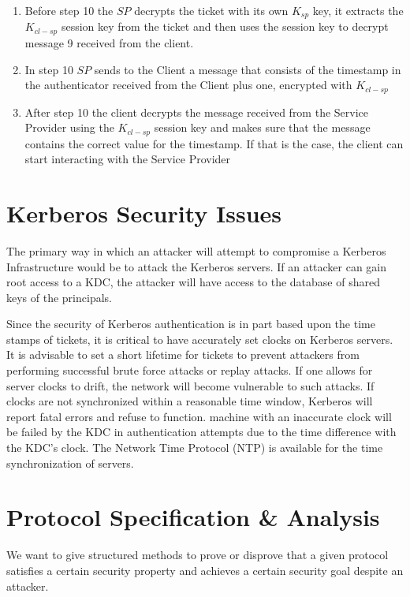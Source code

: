 \begin{enumerate}
	\item Before step 10 the $SP$ decrypts the ticket with its own $K_{sp}$ key, it extracts the $K_{cl-sp}$ session key from the ticket and then uses the session key to decrypt message 9 received from the client.
	\item In step 10 $SP$ sends to the Client a message that consists of the timestamp in the authenticator received from the Client plus one, encrypted with $K_{cl-sp}$
	\item After step 10 the client decrypts the message received from the Service Provider using the $K_{cl-sp}$ session key and makes sure that the message contains the correct value for the timestamp. If that is the case, the client can start interacting with the Service Provider
\end{enumerate}

\section{Kerberos Security Issues}
The primary way in which an attacker will attempt to compromise a Kerberos Infrastructure would be to attack the Kerberos servers. If an attacker can gain root access to a KDC, the attacker will have access to the database of shared keys of the principals. 

Since the security of Kerberos authentication is in part based upon the time stamps of tickets, it is critical to have accurately set clocks on Kerberos servers. It is advisable to set a short lifetime for tickets to prevent attackers from performing successful brute force attacks or replay attacks. If one allows for server clocks to drift, the network will become vulnerable to such attacks. If clocks are not synchronized within a reasonable time window, Kerberos will report fatal errors and refuse to function.  machine with an inaccurate clock will be failed by the KDC in authentication attempts due to the time difference with the KDC's clock.
The Network Time Protocol (NTP) is available for the time synchronization of servers.



\section{Protocol Specification \& Analysis}
We want to give structured methods to prove or disprove that a given protocol satisfies a certain security property and achieves a certain security goal despite an attacker.


